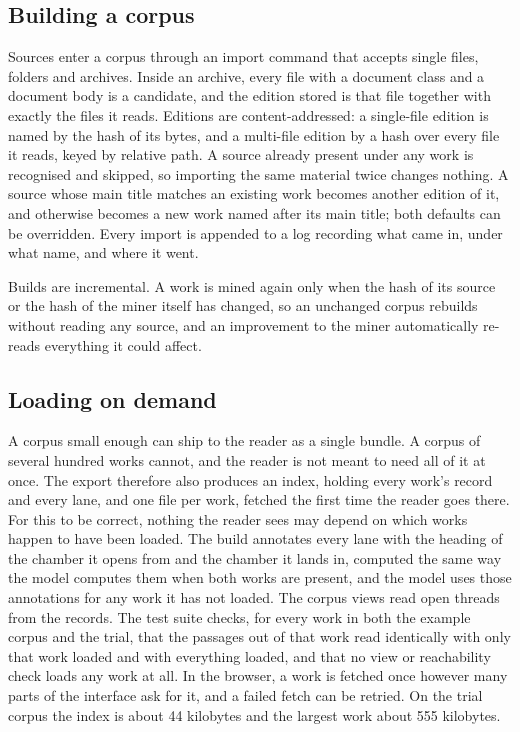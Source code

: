 \documentclass[11pt]{article}
\theoremstyle{remark}
\begin{document}
\subsection{Building a corpus}

Sources enter a corpus through an import command that accepts single files, folders and archives. Inside an archive, every file with a document class and a document body is a candidate, and the edition stored is that file together with exactly the files it reads. Editions are content-addressed: a single-file edition is named by the hash of its bytes, and a multi-file edition by a hash over every file it reads, keyed by relative path. A source already present under any work is recognised and skipped, so importing the same material twice changes nothing. A source whose main title matches an existing work becomes another edition of it, and otherwise becomes a new work named after its main title; both defaults can be overridden. Every import is appended to a log recording what came in, under what name, and where it went.

Builds are incremental. A work is mined again only when the hash of its source or the hash of the miner itself has changed, so an unchanged corpus rebuilds without reading any source, and an improvement to the miner automatically re-reads everything it could affect.

\subsection{Loading on demand}

A corpus small enough can ship to the reader as a single bundle. A corpus of several hundred works cannot, and the reader is not meant to need all of it at once. The export therefore also produces an index, holding every work's record and every lane, and one file per work, fetched the first time the reader goes there. For this to be correct, nothing the reader sees may depend on which works happen to have been loaded. The build annotates every lane with the heading of the chamber it opens from and the chamber it lands in, computed the same way the model computes them when both works are present, and the model uses those annotations for any work it has not loaded. The corpus views read open threads from the records. The test suite checks, for every work in both the example corpus and the trial, that the passages out of that work read identically with only that work loaded and with everything loaded, and that no view or reachability check loads any work at all. In the browser, a work is fetched once however many parts of the interface ask for it, and a failed fetch can be retried. On the trial corpus the index is about 44 kilobytes and the largest work about 555 kilobytes.
\end{document}
